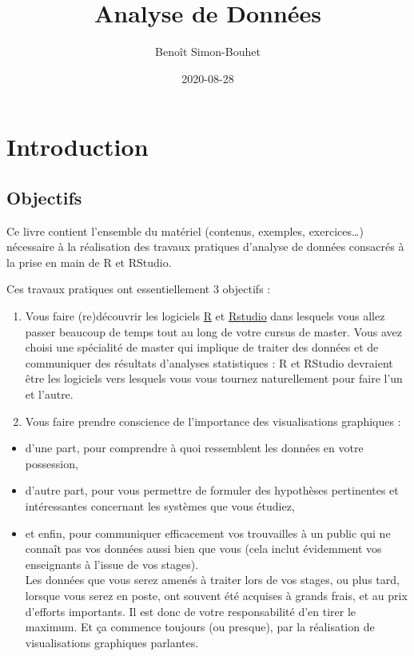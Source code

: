 \documentclass[
  a4paper,
]{article}
\title{Analyse de Données}
\author{Benoît Simon-Bouhet}
\date{2020-08-28}
\providecommand{\tightlist}{%
  \setlength{\itemsep}{0pt}\setlength{\parskip}{0pt}}
\begin{document}
\maketitle

{
\hypersetup{linkcolor=}
\setcounter{tocdepth}{2}
\tableofcontents
}
\hypertarget{introduction}{%
\section{Introduction}\label{introduction}}

\hypertarget{objectifs}{%
\subsection{Objectifs}\label{objectifs}}

Ce livre contient l'ensemble du matériel (contenus, exemples, exercices\ldots) nécessaire à la réalisation des travaux pratiques d'analyse de données consacrés à la prise en main de R et RStudio.

Ces travaux pratiques ont essentiellement 3 objectifs :

\begin{enumerate}
\def\labelenumi{\arabic{enumi}.}
\tightlist
\item
  Vous faire (re)découvrir les logiciels \href{https://cran.r-project.org}{R} et \href{https://www.rstudio.com}{Rstudio} dans lesquels vous allez passer beaucoup de temps tout au long de votre cursus de master. Vous avez choisi une spécialité de master qui implique de traiter des données et de communiquer des résultats d'analyses statistiques : R et RStudio devraient être les logiciels vers lesquels vous vous tournez naturellement pour faire l'un et l'autre.
\item
  Vous faire prendre conscience de l'importance des visualisations graphiques :
\end{enumerate}

\begin{itemize}
\tightlist
\item
  d'une part, pour comprendre à quoi ressemblent les données en votre possession,
\item
  d'autre part, pour vous permettre de formuler des hypothèses pertinentes et intéressantes concernant les systèmes que vous étudiez,
\item
  et enfin, pour communiquer efficacement vos trouvailles à un public qui ne connaît pas vos données aussi bien que vous (cela inclut évidemment vos enseignants à l'issue de vos stages).\\
  Les données que vous serez amenés à traiter lors de vos stages, ou plus tard, lorsque vous serez en poste, ont souvent été acquises à grands frais, et au prix d'efforts importants. Il est donc de votre responsabilité d'en tirer le maximum. Et ça commence toujours (ou presque), par la réalisation de visualisations graphiques parlantes.
\end{itemize}
\end{document}
